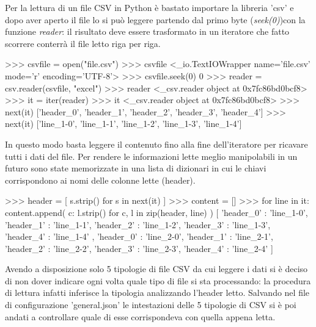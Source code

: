 \documentclass[12pt]{report}
\begin{document}
Per la lettura di un file CSV in Python è bastato importare la libreria 'csv' 
e dopo aver aperto il file lo si può leggere partendo dal primo byte (\textit{seek(0)})con la funzione \textit{reader}: il risultato deve essere trasformato in un iteratore che fatto scorrere conterrà il file letto riga per riga.

\vspace{5mm} %

\begin{python}[title=Lettura di un file CSV, frame=single]
>>> csvfile = open("file.csv")
>>> csvfile
<_io.TextIOWrapper name='file.csv' mode='r' encoding='UTF-8'>
>>> csvfile.seek(0)
0
>>> reader = csv.reader(csvfile, "excel")
>>> reader
<_csv.reader object at 0x7fc86bd0bcf8>
>>> it = iter(reader)
>>> it
<_csv.reader object at 0x7fc86bd0bcf8>
>>> next(it)
['header_0', 'header_1', 'header_2', 'header_3', 'header_4']
>>> next(it)
['line_1-0', 'line_1-1', 'line_1-2', 'line_1-3', 'line_1-4']
\end{python}

\newpage

In questo modo basta leggere il contenuto fino alla fine dell'iteratore per ricavare tutti i dati del file. 
Per rendere le informazioni lette meglio manipolabili in un futuro sono state memorizzate in una lista di dizionari in cui le chiavi corrispondono ai nomi delle colonne lette (header).

\begin{python}[title=Memorizzazione dei dati in un dizionario, frame=single]
>>> header = [ s.strip() for s in next(it) ]
>>> content = []
>>> for line in it:
        content.append(
            {
                c: l.strip() for c, l in zip(header, line)
            }
        )
[ {
    'header_0' : 'line_1-0', 
    'header_1' : 'line_1-1', 
    'header_2' : 'line_1-2', 
    'header_3' : 'line_1-3', 
    'header_4' : 'line_1-4'
} , {
    'header_0' : 'line_2-0', 
    'header_1' : 'line_2-1', 
    'header_2' : 'line_2-2', 
    'header_3' : 'line_2-3', 
    'header_4' : 'line_2-4'
} ]
\end{python}

\vspace{5mm} %

Avendo a disposizione solo 5 tipologie di file CSV da cui leggere i dati si è deciso di non dover indicare ogni volta quale tipo di file si sta processando: la procedura di lettura infatti inferisce la tipologia analizzando l'header letto.
Salvando nel file di configurazione 'general.json' le intestazioni delle 5 tipologie di CSV si è poi andati a controllare quale di esse corrispondeva con quella appena letta.
\end{document}

